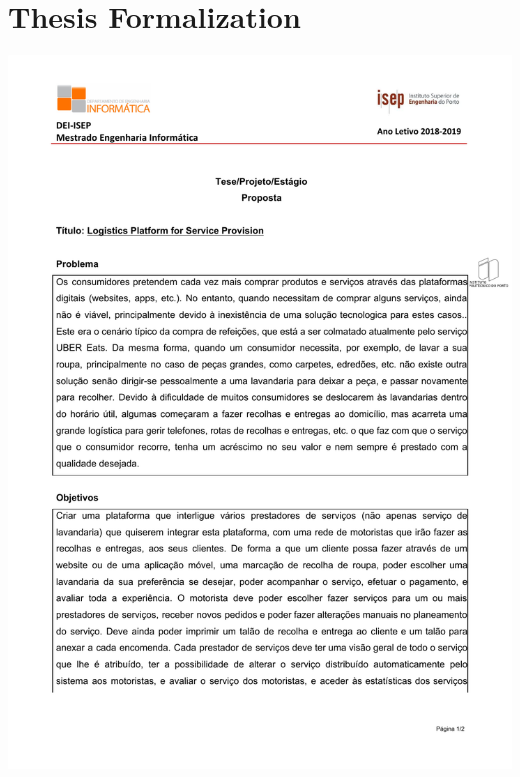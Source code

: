 
\chapter{Thesis Formalization} %

\label{AppendixA} %

 \includegraphics[page=1, width=\textwidth ]{appendices/files/thesis_formal.pdf}

\pagebreak

